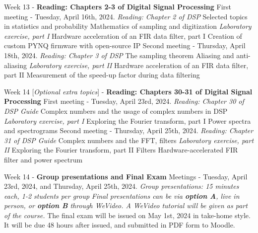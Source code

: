 \documentclass[10pt]{article}
\begin{document}
\begin{outline}[enumerate]
\1 Week 13 - \textbf{Reading: Chapters 2-3 of Digital Signal Processing}
\2 First meeting - Tuesday, April 16th, 2024. \textit{Reading: Chapter 2 of DSP}
\3 Selected topics in statistics and probability
\3 Mathematics of sampling and digitization
\3 \textit{Laboratory exercise, part I}
\4 Hardware acceleration of an FIR data filter, part I
\4 Creation of custom PYNQ firmware with open-source IP
\2 Second meeting - Thursday, April 18th, 2024. \textit{Reading: Chapter 3 of DSP}
\3 The sampling theorem
\3 Aliasing and anti-aliasing
\3 \textit{Laboratory exercise, part II}
\4 Hardware acceleration of an FIR data filter, part II
\4 Measurement of the speed-up factor during data filtering

\1 Week 14 [\textit{Optional extra topics}] - \textbf{Reading: Chapters 30-31 of Digital Signal Processing}
\2 First meeting - Tuesday, April 23rd, 2024. \textit{Reading: Chapter 30 of DSP Guide}
\3 Complex numbers and the usage of complex numbers in DSP
\3 \textit{Laboratory exercise, part I}
\4 Exploring the Fourier transform, part I
\4 Power spectra and spectrograms
\2 Second meeting - Thursday, April 25th, 2024. \textit{Reading: Chapter 31 of DSP Guide}
\3 Complex numbers and the FFT, filters
\3 \textit{Laboratory exercise, part II}
\4 Exploring the Fourier transform, part II
\4 Filters
\4 Hardware-accelerated FIR filter and power spectrum

\1 Week 14 - \textbf{Group presentations and Final Exam}
\2 Meetings - Tuesday, April 23rd, 2024, and Thursday, April 25th, 2024.
\3 \textit{Group presentations: 15 minutes each, 1-2 students per group}
\3 \textit{Final presentations can be via \textbf{option A}, live in person, or \textbf{option B} through WeVideo. A WeVideo tutorial will be given as part of the course.}
\2 The final exam will be issued on May 1st, 2024 in take-home style.  It will be due 48 hours after issued, and submitted in PDF form to Moodle.
\end{outline}
\end{document}
